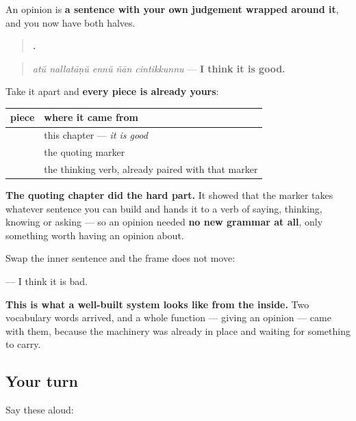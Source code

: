\begin{grammarlens}[title={Grammar Lens: nothing new is needed}]
An opinion is \textbf{a sentence with your own judgement wrapped around it}, and you now have both halves.

\begin{quote}
\textbf{    .}
\end{quote}

\begin{quote}
\emph{atŭ nallatāṇŭ ennŭ ñān cintikkunnu} — \textbf{I think it is good.}
\end{quote}

Take it apart and \textbf{every piece is already yours}:

\noindent
\begin{tabularx}{\linewidth}{@{}>{\raggedright\arraybackslash}X>{\raggedright\arraybackslash}X@{}}
\toprule
\textbf{piece} & \textbf{where it came from} \\
\midrule
\textbf{\ml{അത്} \ml{നല്ലതാണ്}} & this chapter — \emph{it is good} \\
\textbf{\ml{എന്ന്}} & the quoting marker \\
\textbf{\ml{ഞാൻ} \ml{ചിന്തിക്കുന്നു}} & the thinking verb, already paired with that marker \\
\bottomrule
\end{tabularx}

\textbf{The quoting chapter did the hard part.} It showed that the marker takes whatever sentence you can build and hands it to a verb of saying, thinking, knowing or asking — so an opinion needed \textbf{no new grammar at all}, only something worth having an opinion about.

Swap the inner sentence and the frame does not move:

\textbf{    } — I think it is bad.

\textbf{This is what a well-built system looks like from the inside.} Two vocabulary words arrived, and a whole function — giving an opinion — came with them, because the machinery was already in place and waiting for something to carry.
\end{grammarlens}

\subsection*{Your turn}
Say these aloud:

